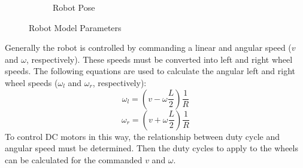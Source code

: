\begin{figure}
\begin{subfigure}{0.7\textwidth}
        \caption{Robot Pose}
        \label{fig:robotPose}
    \end{subfigure}
    \caption{Robot Model Parameters}
    \label{fig:robotModelParameters}
\end{figure}
%

\vspace*{12pt}
\noindent
Generally the robot is controlled by commanding a linear and angular speed ($v$ and $\omega$, respectively). These speeds must be converted into left and right wheel speeds. The following equations are used to calculate the angular left and right wheel speeds ($\omega_l$ and $\omega_r$, respectively):
$$\omega_l = \left(v - \omega\frac{L}{2}\right)\frac{1}{R}$$
$$\omega_r = \left(v + \omega\frac{L}{2}\right)\frac{1}{R}$$
To control DC motors in this way, the relationship between duty cycle and angular speed must be determined. Then the duty cycles to apply to the wheels can be calculated for the commanded $v$ and $\omega$.

